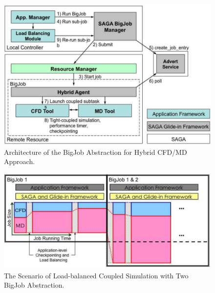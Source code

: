 \documentclass[a4paper]{article}
\newcommand{\jhanote}[1]{ {\textcolor{red} { ***Jha: #1 }}}
\newcommand{\jhanote}[1]{}
\begin{document}
\begin{figure}
\centering
\includegraphics  [scale=0.5, angle=0]{Image2_2}
\caption{Architecture of the BigJob Abstraction for Hybrid CFD/MD Approach.} 
\end{figure}

\begin{figure}
\centering
\includegraphics [scale=0.5, angle=0]{Image3_2}
\caption{The Scenario of Load-balanced Coupled Simulation with Two BigJob Abstraction.}
\end{figure}

\noindent 
\end{document}
